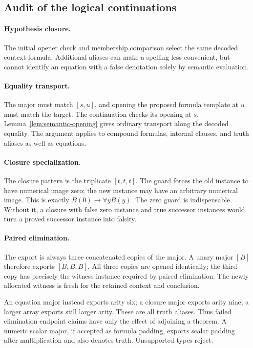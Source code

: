 \documentclass[11pt,letterpaper]{article}
\theoremstyle{definition}\newtheorem{definition}[theorem]{Definition}
\theoremstyle{remark}\newtheorem{remark}[theorem]{Remark}
\begin{document}
\subsection{Audit of the logical continuations}
\label{subsec:logical-audit}

\paragraph{Hypothesis closure.}
The initial opener check and membership comparison select the same
decoded context formula.  Additional aliases can make a spelling less
convenient, but cannot identify an equation with a false denotation
solely by semantic evaluation.

\paragraph{Equality transport.}
The major must match $[s,u]$, and opening the proposed formula template
at $u$ must match the target.  The continuation checks its opening at
$s$.  Lemma~\ref{lem:semantic-opening} gives ordinary transport along
the decoded equality.  The argument applies to compound formulas,
internal clauses, and truth aliases as well as equations.

\paragraph{Closure specialization.}
The closure pattern is the triplicate $[t,t,t]$.  The guard forces the
old instance to have numerical image zero; the new instance may have
an arbitrary numerical image.  This is exactly
$B(0)\to\forall yB(y)$.  The zero guard is indispensable.  Without
it, a closure with false zero instance and true successor instances
would turn a proved successor instance into falsity.

\paragraph{Paired elimination.}
The export is always three concatenated copies of the major.  A unary
major $[B]$ therefore exports $[B,B,B]$.  All three copies are opened
identically; the third copy has precisely the witness instance required
by paired elimination.  The newly allocated witness is fresh for the
retained context and conclusion.

An equation major instead exports arity six; a closure major exports
arity nine; a larger array exports still larger arity.  These are all
truth aliases.  Thus failed elimination endpoint claims have only the
effect of adjoining a theorem.  A numeric scalar major, if accepted as
formula padding, exports scalar padding after multiplication and also
denotes truth.  Unsupported types reject.
\end{document}
